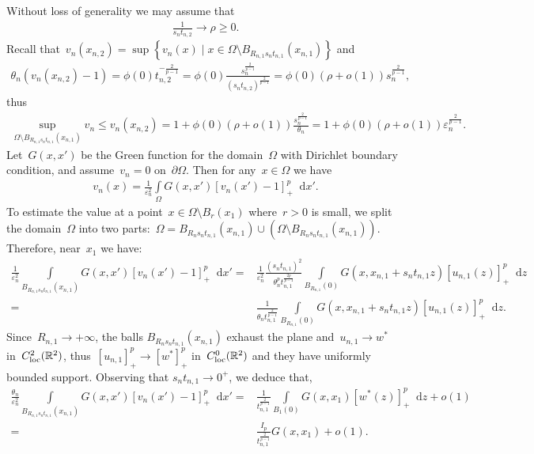 \documentclass[10pt]{amsart}
\newcommand{\braces}[1]{\left\{#1\right\}} %
\newcommand{\R}{\mathbb{R}}
\newcommand{\dd}{\mathop{}\!\mathrm{d}}
\newcommand{\eps}{\varepsilon}
\newcommand{\p}{\partial}
\def\R{\mathbb{R}}
\renewcommand{\to}{\rightarrow}
\begin{document}
    Without loss of generality we may assume that
    \begin{align*}
        \frac{1}{s_n t_{n,2}}\to \rho\geq 0.
    \end{align*}
    Recall that~$v_n(x_{n,2})=\sup\braces{v_n(x)\mid x\in \Omega\setminus B_{R_{n,1}s_n t_{n,1}}(x_{n,1})}$ and
    \begin{align*}
        \theta_n (v_n(x_{n,2})-1)=\phi(0)t_{n,2}^{-\frac{2}{p-1}}=\phi(0)\frac{s_n^{\frac{2}{p-1}}}{(s_n t_{n,2})^{\frac{2}{p-1}}}= \phi(0)(\rho+ o(1)) s_n^{\frac{2}{p-1}},
    \end{align*}
    thus
    \begin{align}\label{eq:decay away from x1}
        \sup_{\Omega\setminus B_{R_{n,1}s_n t_{n,1}}(x_{n,1})} v_n
        \leq v_n(x_{n,2}) = 1 + \phi(0)(\rho+o(1))\frac{s_n^{\frac{2}{p-1}}}{\theta_n}= 1 + \phi(0)(\rho+o(1))\eps_n^{\frac{2}{p-1}}.
    \end{align}
    Let~$G(x,x')$ be the Green function for the domain~$\Omega$ with Dirichlet boundary condition, and assume~$v_n=0$ on~$\p\Omega$.
    Then for any~$x\in \Omega$ we have
    \begin{align*}
        v_n(x)=\frac{1}{\eps_n^2}\int\limits_{\Omega} G(x,x') [v_n(x')-1]_+^p\dd{x'}.
    \end{align*}
    To estimate the value at a point~$x\in \Omega\setminus B_{r}(x_{1})$ where~$r>0$ is small,
    we split the domain~$\Omega$ into two parts:~$\Omega= B_{R_n s_n t_{n,1}}(x_{n,1})\cup (\Omega\setminus B_{R_n s_n t_{n,1}}(x_{n,1}))$.
    Therefore, near~$x_1$ we have:
    \begin{align*}
        \frac{1}{\eps_n^2} \int\limits_{B_{R_{n,1}s_n t_{n,1}}(x_{n,1})} G(x,x')[v_n(x')-1]_+^p\dd{x'}
        =&\frac{1}{\eps_n^2} \frac{(s_n t_{n,1})^2}{\theta_n^p t_{n,1}^{\frac{2p}{p-1}}}
        \int\limits_{B_{R_{n,1}}(0)} G(x, x_{n,1}+ s_n t_{n,1} z) [u_{n,1}(z)]_+^p \dd{z}\\
        =&\frac{1}{\theta_n t_{n,1}^{\frac{2}{p-1}}}\int\limits_{B_{R_{n,1} } (0)} G(x,x_{n,1}+s_n t_{n,1}z) [u_{n,1}(z)]_+^p\dd{z}.
    \end{align*}
    Since~$R_{n,1}\to+\infty$,  the balls $B_{R_n s_n t_{n,1}}(x_{n,1})$ exhaust the plane and~$u_{n,1}\to w^*$
    in~$C^2_{\rm loc}(\R^2)$, thus~$[u_{n,1}]_+^p\to [w^*]_+^p$ in~$C^0_{\rm loc}(\R^2)$ and they have uniformly bounded support.
    Observing that $s_n t_{n,1}\to 0^+$, we deduce that,
    \begin{align*}
        \frac{\theta_n}{\eps_n^2}\int\limits_{B_{R_{n,1}s_n t_{n,1}}(x_{n,1})} G(x,x')[v_n(x')-1]_+^p\dd{x'}
        =&\frac{1}{t_{n,1}^{\frac{2}{p-1}}} \int\limits_{B_1(0)} G(x,x_{1}) [w^*(z)]_+^p\dd{z} + o(1) \\
        =&\frac{I_p}{t_{n,1}^{\frac{2}{p-1}}}G(x,x_1)+ o(1).
    \end{align*}
\end{document}
